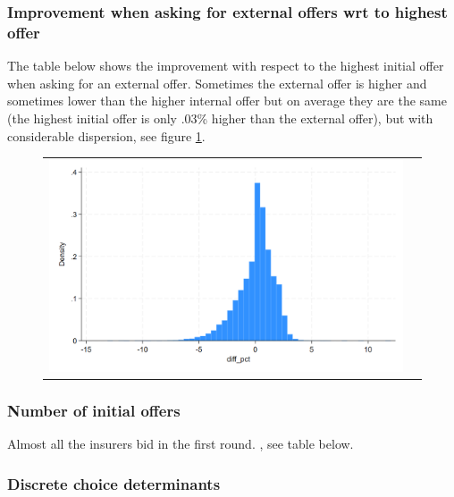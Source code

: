 \documentclass[12pt]{article}
\begin{document}
\subsubsection{Improvement when asking for external offers wrt to highest offer}

The table below shows the improvement with respect to the highest initial offer when asking for an external offer. Sometimes the external offer is higher and sometimes lower than the higher internal offer but on average they are the same (the highest initial offer is only .03\% higher than the external offer), but with considerable dispersion, see figure \ref{fig:ie3_6}. 





\begin{figure}[H]
\caption{}
\label{fig:ie3_6}
\centering{}%
\begin{tabular}{cc}
\includegraphics[scale=0.27]{figures/IE3_offer_change_max_internal.png}
\end{tabular}
\end{figure}


\subsubsection{Number of initial offers}


Almost all the insurers bid in the first round. , see table below.



\subsubsection{Discrete choice determinants}
\end{document}
